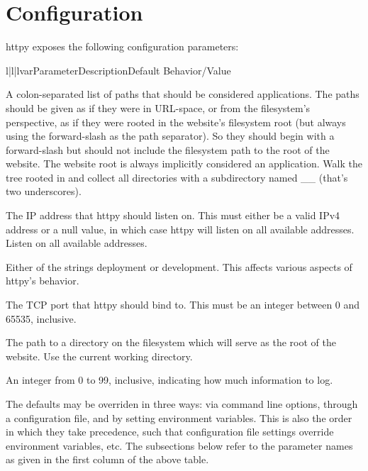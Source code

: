 \chapter{Configuration}

httpy exposes the following configuration parameters:


\begin{tableiii}{l|l|l}{var}{Parameter}{Description}{Default Behavior/Value}

    {A colon-separated list of paths that should be considered applications. The
    paths should be given as if they were in URL-space, or from the filesystem's
    perspective, as if they were rooted in the website's filesystem root (but
    always using the forward-slash as the path separator). So they should begin
    with a forward-slash but should not include the filesystem path to the root
    of the website. The website root is always implicitly considered an
    application.}
    {Walk the tree rooted in  and collect all directories with a
    subdirectory named __ (that's two underscores).}

    {The IP address that httpy should listen on. This must either be a valid
    IPv4 address or a null value, in which case httpy will listen on all
    available addresses.}
    {Listen on all available addresses.}

    {Either of the strings deployment or development. This affects various
    aspects of httpy's behavior.}
    {}

    {The TCP port that httpy should bind to. This must be an integer between 0
    and 65535, inclusive.}
    {}

    {The path to a directory on the filesystem which will serve as the root of
    the website.}
    {Use the current working directory.}

    {An integer from 0 to 99, inclusive, indicating how much information to
    log.}
    {}

\end{tableiii}

The defaults may be overriden in three ways: via command line options, through a
configuration file, and by setting environment variables. This is also the order
in which they take precedence, such that configuration file settings override
environment variables, etc. The subsections below refer to the parameter names
as given in the first column of the above table.




